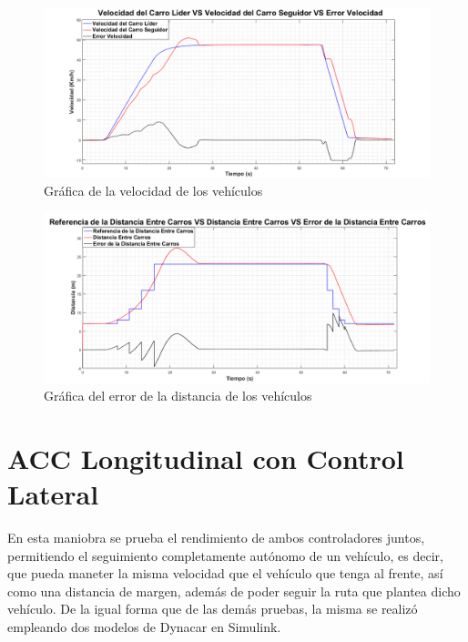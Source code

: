 \begin{itemize}
\begin{figure}[H]
	\centering
		\includegraphics[scale=0.35]{Imagenes/stg50}
		\caption{Gráfica de la velocidad de los vehículos}
		\label{fig:velstg50}
\end{figure}	

\begin{figure}[H]
	\centering
		\includegraphics[scale=0.35]{Imagenes/stg50dist}
		\caption{Gráfica del error de la distancia de los vehículos}
		\label{fig:diststg50}
\end{figure}	
\end{itemize}

\section{ACC Longitudinal con Control Lateral}

En esta maniobra se prueba el rendimiento de ambos controladores juntos, permitiendo el seguimiento completamente autónomo de un vehículo, es decir, que pueda maneter la misma velocidad que el vehículo que tenga al frente, así como una distancia de margen, además de poder seguir la ruta que plantea dicho vehículo. De la igual forma que de las demás pruebas, la misma se realizó empleando dos modelos de Dynacar en Simulink.
  
